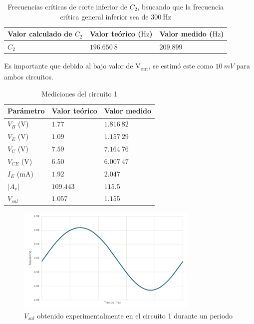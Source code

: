 \documentclass[journal]{IEEEtran}
\begin{document}
\begin{table}[H]
        \centering
        \renewcommand{\arraystretch}{1.5}
        \caption{Frecuencias críticas de corte inferior de $C_2$, bsucando que la frecuencia crítica general inferior sea de $\mathrm{300~Hz}$}
        \begin{tabular}{ >{\centering\arraybackslash}m{2.5cm} >{\centering\arraybackslash}m{2.5cm} >{\centering\arraybackslash}m{2.5cm} }
                \hline
            Valor calculado de $C_2$ & Valor teórico ($\mathrm{Hz}$) & Valor medido ($\mathrm{Hz}$)\\ 
            \hline
            \centering
            $C_2$ & $196.650~8$  & $209.899$  \\ 
            \hline
        \end{tabular}
        \label{tabla11}
    \end{table}  
Es importante que debido al bajo valor de V\textsubscript{ent}, se estimó este como $10~mV$ para ambos circuitos. 
\begin{table}[H]
        \renewcommand{\arraystretch}{1.5}
        \caption{Mediciones del circuito 1}
        \centering
        \begin{tabular}{ >{\centering\arraybackslash}m{2.5cm} >{\centering\arraybackslash}m{2.5cm} >{\centering\arraybackslash}m{2.5cm} }
                \hline
            Parámetro & Valor teórico & Valor medido\\ 
            \hline
            $V_B$ ($\mathrm{V}$) & $1.77$  & $1.816~82$  \\ 
            $V_E$ ($\mathrm{V}$) & $1.09$  & $1.157~29$  \\
            $V_C$ ($\mathrm{V}$) & $7.59$  & $7.164~76$  \\
            $V_{CE}$ ($\mathrm{V}$) & $6.50$  & $6.007~47$  \\
            $I_E$ ($\mathrm{mA}$) & $1.92$  & $2.047$ \\ 
            $|A_v|$  & $109.443$ & $115.5$  \\
            $V_{sal}$ & $1.057$  & $1.155$ \\
            \hline
        \end{tabular}
        \label{tabla5}
    \end{table}

\begin{figure}[H]
        \centering
        \includegraphics[width=3.4in]{OutC1.png}
        \caption{$V_{sal}$ obtenido experimentalmente en el circuito 1 durante un periodo}
        \label{fig:SignalExperimental_0222}
\end{figure}
    
\end{document}
